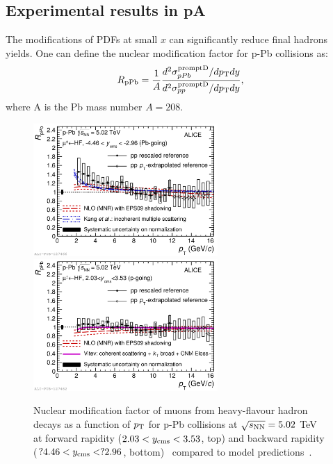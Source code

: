 \subsection{Experimental results in pA}
The modifications of PDFs at small $x$ can significantly reduce final hadrons yields.
One can define the nuclear modification factor for p-Pb collisions as:
\begin{equation}
R_{\rm pPb} = \frac{1}{A}\frac{d^2\sigma_{pPb}^{\rm prompt D}/dp_{\rm T} dy}{d^2\sigma_{pp}^{\rm prompt D}/dp_{\rm T} dy},
\end{equation}
where A is the Pb mass number $A = 208$. \\
\begin{figure}[!ht]
  \centering
  \includegraphics[width=7cm]{FigCap2/2017-Feb-05-Fig2b.pdf}
  \includegraphics[width=7cm]{FigCap2/2017-Feb-05-Fig2a.pdf}
  \caption{Nuclear modification factor of muons from heavy-flavour hadron decays as a function of $p_{\rm T}$ for p-Pb collisions at $\sqrt{s_{\rm NN}} = 5.02$ TeV at forward rapidity ($2.03 < y_{\rm cms} < 3.53$, top) and backward rapidity ($?4.46 < y_{\rm cms} < ?2.96$, bottom)~\cite{Acharya:2017hdv} compared to model predictions~\cite{Kang:2014hha,Mangano:1991jk}. }
  \label{fig:muons}
\end{figure}
